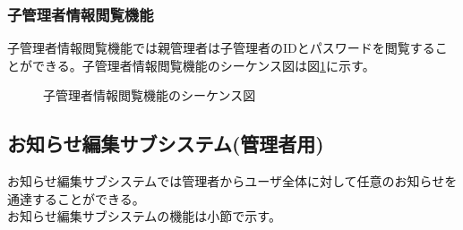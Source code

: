 \documentclass[a4j]{jarticle}
\begin{document}
  \subsubsection{子管理者情報閲覧機能}
  子管理者情報閲覧機能では親管理者は子管理者のIDとパスワードを閲覧することができる。子管理者情報閲覧機能のシーケンス図は図\ref{fig:admin_children-reading.png}に示す。
  \begin{figure}[H]
    \centering
    \caption{子管理者情報閲覧機能のシーケンス図}
    \label{fig:admin_children-reading.png}
  \end{figure}
  \subsection{お知らせ編集サブシステム(管理者用)}
  お知らせ編集サブシステムでは管理者からユーザ全体に対して任意のお知らせを通達することができる。\\
  お知らせ編集サブシステムの機能は小節で示す。
\end{document}
